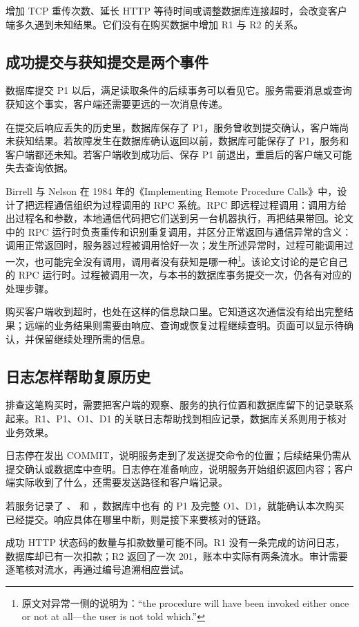 增加 TCP 重传次数、延长 HTTP 等待时间或调整数据库连接超时，会改变客户端多久遇到未知结果。它们没有在购买数据中增加 R1 与 R2 的关系。

\subsection*{成功提交与获知提交是两个事件}

数据库提交 P1 以后，满足读取条件的后续事务可以看见它。服务需要消息或查询获知这个事实，客户端还需要更远的一次消息传递。

在提交后响应丢失的历史里，数据库保存了 P1，服务曾收到提交确认，客户端尚未获知结果。若故障发生在数据库确认返回以前，数据库可能保存了 P1，服务和客户端都还未知。若客户端收到成功后、保存 P1 前退出，重启后的客户端又可能失去查询依据。



Birrell 与 Nelson 在 1984 年的《Implementing Remote Procedure Calls》中，设计了把远程通信组织为过程调用的 RPC 系统。RPC 即远程过程调用：调用方给出过程名和参数，本地通信代码把它们送到另一台机器执行，再把结果带回。论文中的 RPC 运行时负责重传和识别重复调用，并区分正常返回与通信异常的含义：调用正常返回时，服务器过程被调用恰好一次；发生所述异常时，过程可能调用过一次，也可能完全没有调用，调用者没有获知是哪一种\cite{rpc}\footnote{原文对异常一侧的说明为：“the procedure will have been invoked either once or not at all---the user is not told which.”}。该论文讨论的是它自己的 RPC 运行时。过程被调用一次，与本书的数据库事务提交一次，仍各有对应的处理步骤。

购买客户端收到超时，也处在这样的信息缺口里。它知道这次通信没有给出完整结果；远端的业务结果则需要由响应、查询或恢复过程继续查明。页面可以显示待确认，并保留继续处理所需的信息。

\subsection*{日志怎样帮助复原历史}

排查这笔购买时，需要把客户端的观察、服务的执行位置和数据库留下的记录联系起来。R1、P1、O1、D1 的关联日志帮助找到相应记录，数据库关系则用于核对业务效果。

日志停在发出 COMMIT，说明服务走到了发送提交命令的位置；后续结果仍需从提交确认或数据库中查明。日志停在准备响应，说明服务开始组织返回内容；客户端实际收到了什么，还需要发送路径和客户端记录。

若服务记录了 、 和 ，数据库中也有  的 P1 及完整 O1、D1，就能确认本次购买已经提交。响应具体在哪里中断，则是接下来要核对的链路。

成功 HTTP 状态码的数量与扣款数量可能不同。R1 没有一条完成的访问日志，数据库却已有一次扣款；R2 返回了一次 201，账本中实际有两条流水。审计需要逐笔核对流水，再通过编号追溯相应尝试。
\FloatBarrier
